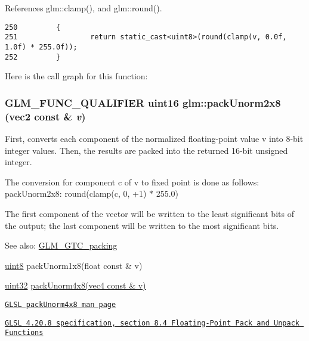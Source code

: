 References glm::clamp(), and glm::round().

\begin{Code}\begin{verbatim}250         {
251                 return static_cast<uint8>(round(clamp(v, 0.0f, 1.0f) * 255.0f));
252         }
\end{verbatim}
\end{Code}




Here is the call graph for this function:\hypertarget{group__gtc__packing_g833288fc0d4a79f19d0db75a6843bfe6}{
\subsubsection[packUnorm2x8]{\setlength{\rightskip}{0pt plus 5cm}GLM\_\-FUNC\_\-QUALIFIER uint16 glm::packUnorm2x8 (vec2 const \& {\em v})}}
\label{group__gtc__packing_g833288fc0d4a79f19d0db75a6843bfe6}


First, converts each component of the normalized floating-point value v into 8-bit integer values. Then, the results are packed into the returned 16-bit unsigned integer.

The conversion for component c of v to fixed point is done as follows: packUnorm2x8: round(clamp(c, 0, +1) $\ast$ 255.0)

The first component of the vector will be written to the least significant bits of the output; the last component will be written to the most significant bits.

\begin{Desc}
\item[See also:]\hyperlink{group__gtc__packing}{GLM\_\-GTC\_\-packing} 

\hyperlink{group__gtc__type__precision_g1a7dcd8aac97cc8020817c94049deff2}{uint8} packUnorm1x8(float const \& v) 

\hyperlink{group__gtc__type__precision_g202b6a53c105fcb7e531f9b443518451}{uint32} \hyperlink{group__core__func__packing_g834ee9a9e73dcb0a7c1fc88143f3edb8}{packUnorm4x8(vec4 const \& v)} 

\href{http://www.opengl.org/sdk/docs/manglsl/xhtml/packUnorm4x8.xml}{\tt GLSL packUnorm4x8 man page} 

\href{http://www.opengl.org/registry/doc/GLSLangSpec.4.20.8.pdf}{\tt GLSL 4.20.8 specification, section 8.4 Floating-Point Pack and Unpack Functions} \end{Desc}


